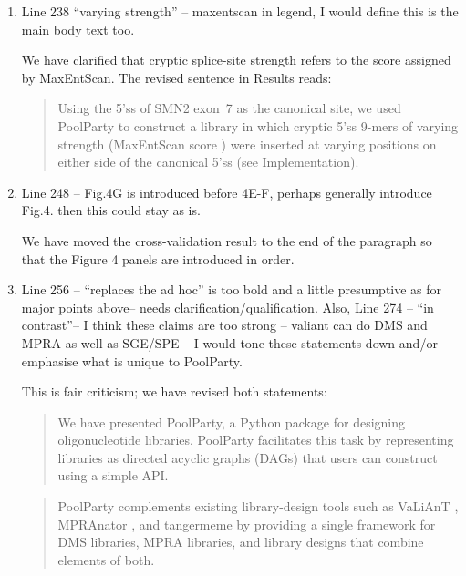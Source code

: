 \documentclass[11pt]{article}
\newenvironment{response}{\par\color{responseblue}}{\par}
\newenvironment{msquote}
  {\begin{quote}\color{quotedtext}\noindent\ignorespaces}
  {\end{quote}}
\begin{document}
\begin{enumerate}
\item Line 238 ``varying strength'' -- maxentscan in legend, I would define this
is the main body text too.

\begin{response}
We have clarified that cryptic splice-site strength refers to the score assigned by MaxEntScan. The revised sentence in Results reads:

\begin{msquote}
Using the 5'ss of SMN2 exon~7 as the canonical site, we used PoolParty to construct a library in which cryptic 5'ss 9-mers of varying strength
(MaxEntScan score \citep{Yeo2004me}) were inserted at varying positions on either side of the canonical 5'ss (see Implementation).
\end{msquote}
\end{response}

\item Line 248 -- Fig.4G is introduced before 4E-F, perhaps generally introduce
Fig.4. then this could stay as is.

\begin{response}
We have moved the cross-validation result to the end of the paragraph so that
the Figure 4 panels are introduced in order. 
\end{response}

\item Line 256 -- ``replaces the ad hoc'' is too bold and a little presumptive as
for major points above-- needs clarification/qualification. Also, Line 274 --
``in contrast''-- I think these claims are too strong -- valiant can do DMS and
MPRA as well as SGE/SPE -- I would tone these statements down and/or emphasise
what is unique to PoolParty.

\begin{response}
This is fair criticism; we have revised both statements:

\begin{msquote}
We have presented PoolParty, a Python package for designing oligonucleotide libraries. PoolParty facilitates this task by representing libraries as directed acyclic graphs (DAGs) that users can construct using a simple API.
\end{msquote}

\begin{msquote}
PoolParty complements existing library-design tools such as VaLiAnT \citep{Barbon2022th}, MPRAnator \citep{GeorgakopoulosSoares2017gb}, and tangermeme \citep{Schreiber2025nd} by
providing a single framework for DMS libraries, MPRA libraries, and library designs that combine elements of both.
\end{msquote}
\end{response}


\end{enumerate}
\end{document}

